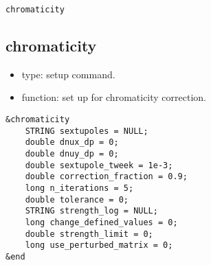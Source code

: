 \documentclass[11pt]{article}
\begin{document}
\begin{latexonly}
\newpage
\begin{center}{\Large\verb|chromaticity|}\end{center}
\end{latexonly}
\subsection{chromaticity \label{subsec:chromaticity}}

\begin{itemize}
\item type: setup command.
\item function: set up for chromaticity correction.
\end{itemize}

\begin{verbatim}
&chromaticity
    STRING sextupoles = NULL;
    double dnux_dp = 0;
    double dnuy_dp = 0;
    double sextupole_tweek = 1e-3;
    double correction_fraction = 0.9;
    long n_iterations = 5;
    double tolerance = 0;
    STRING strength_log = NULL;
    long change_defined_values = 0;
    double strength_limit = 0;
    long use_perturbed_matrix = 0;    
&end
\end{verbatim}
\end{document}
